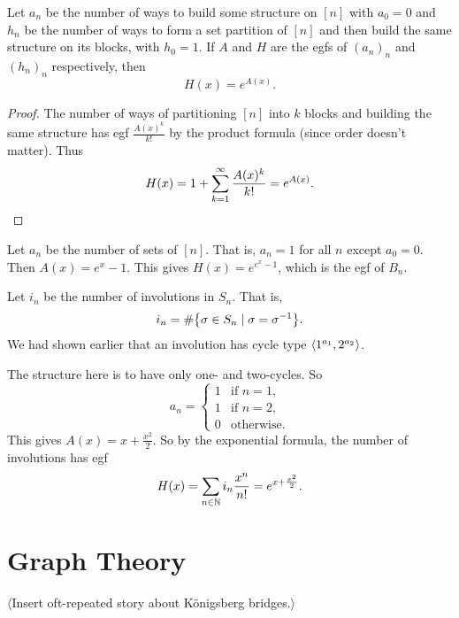 \begin{theorem*} \label{thm:egf:formula}
    Let $a_n$ be the number of ways to build some structure on $[n]$ with
    $a_0 = 0$ and $h_n$ be the number of ways to form a set partition of
    $[n]$ and then build the same structure on its blocks, with $h_0 = 1$.
    If $A$ and $H$ are the egfs of $(a_n)_n$ and $(h_n)_n$ respectively,
    then \[
        H(x) = e^{A(x)}.
    \]
\end{theorem*}
\begin{proof}
    The number of ways of partitioning $[n]$ into $k$ blocks and building
    the same structure has egf $\frac{A(x)^k}{k!}$ by the product formula
    (since order doesn't matter).
    Thus \[
        H(x) = 1 + \sum_{k=1}^{\infty}\frac{A(x)^k}{k!} = e^{A(x)}. \qedhere
    \]
\end{proof}
\begin{examples}
    \item Let $a_n$ be the number of sets of $[n]$.
    That is, $a_n = 1$ for all $n$ except $a_0 = 0$.
    Then $A(x) = e^x - 1$.
    This gives $H(x) = e^{e^{x} - 1}$, which is the egf of $B_n$.
    \item Let $i_n$ be the number of involutions in $S_n$.
    That is, \[
        i_n = \#\set{\sigma \in S_n \mid \sigma = \sigma^{-1}}.
    \]
    We had shown earlier that an involution has cycle type
    $\angled{1^{a_1}, 2^{a_2}}$.

    The structure here is to have only one- and two-cycles.
    So \[
        a_n = \begin{cases}
            1 & \text{if } n = 1, \\
            1 & \text{if } n = 2, \\
            0 & \text{otherwise}.
        \end{cases}
    \] This gives $A(x) = x + \frac{x^2}{2}$.
    So by the exponential formula, the number of involutions has egf \[
        H(x) = \sum_{n \in \mathbb{N}} i_n \frac{x^n}{n!} = e^{x + \frac{x^2}{2}}.
    \]
\end{examples}

\chapter{Graph Theory}
$\langle$Insert oft-repeated story about Königsberg bridges.$\rangle$

